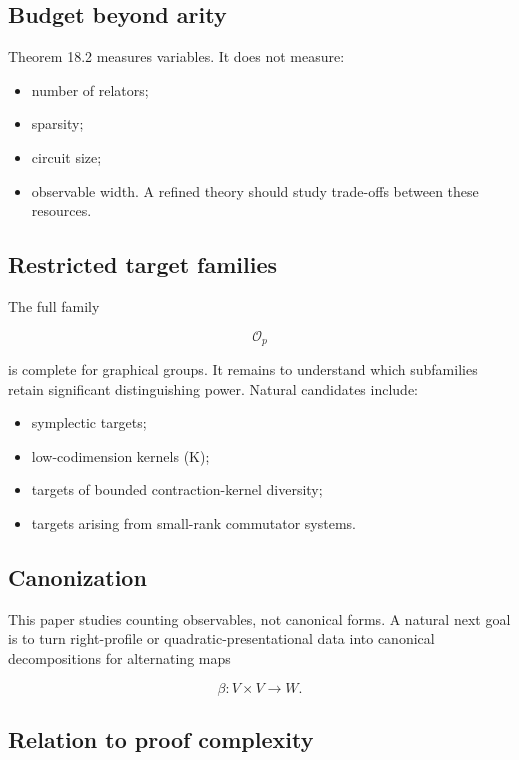 \documentclass[11pt]{article}
\begin{document}
\subsection{Budget beyond arity}

Theorem 18.2 measures variables. It does not measure:

\begin{itemize}
\item number of relators;
\item sparsity;
\item circuit size;
\item observable width.
A refined theory should study trade-offs between these resources.

\end{itemize}

\subsection{Restricted target families}

The full family

\[
\mathcal O_p
\]

is complete for graphical groups. It remains to understand which subfamilies retain significant distinguishing power. Natural candidates include:

\begin{itemize}
\item symplectic targets;
\item low-codimension kernels (K);
\item targets of bounded contraction-kernel diversity;
\item targets arising from small-rank commutator systems.
\end{itemize}

\subsection{Canonization}

This paper studies counting observables, not canonical forms. A natural next goal is to turn right-profile or quadratic-presentational data into canonical decompositions for alternating maps

\[
\beta:V\times V\to W.
\]

\subsection{Relation to proof complexity}
\end{document}
